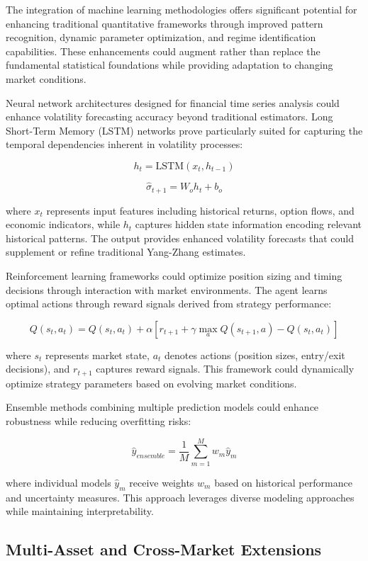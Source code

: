 \documentclass[
  american,
  11pt,
  11pt,
  letterpaper,
  onecolumn]{article}
\begin{document}
The integration of machine learning methodologies offers significant
potential for enhancing traditional quantitative frameworks through
improved pattern recognition, dynamic parameter optimization, and regime
identification capabilities. These enhancements could augment rather
than replace the fundamental statistical foundations while providing
adaptation to changing market conditions.

Neural network architectures designed for financial time series analysis
could enhance volatility forecasting accuracy beyond traditional
estimators. Long Short-Term Memory (LSTM) networks prove particularly
suited for capturing the temporal dependencies inherent in volatility
processes:

\[h_t = \text{LSTM}(x_t, h_{t-1})\]

\[\hat{\sigma}_{t+1} = W_o h_t + b_o\]

where \(x_t\) represents input features including historical returns,
option flows, and economic indicators, while \(h_t\) captures hidden
state information encoding relevant historical patterns. The output
provides enhanced volatility forecasts that could supplement or refine
traditional Yang-Zhang estimates.

Reinforcement learning frameworks could optimize position sizing and
timing decisions through interaction with market environments. The agent
learns optimal actions through reward signals derived from strategy
performance:

\[Q(s_t, a_t) = Q(s_t, a_t) + \alpha[r_{t+1} + \gamma \max_a Q(s_{t+1}, a) - Q(s_t, a_t)]\]

where \(s_t\) represents market state, \(a_t\) denotes actions (position
sizes, entry/exit decisions), and \(r_{t+1}\) captures reward signals.
This framework could dynamically optimize strategy parameters based on
evolving market conditions.

Ensemble methods combining multiple prediction models could enhance
robustness while reducing overfitting risks:

\[\hat{y}_{ensemble} = \frac{1}{M}\sum_{m=1}^{M} w_m \hat{y}_m\]

where individual models \(\hat{y}_m\) receive weights \(w_m\) based on
historical performance and uncertainty measures. This approach leverages
diverse modeling approaches while maintaining interpretability.

\subsection{Multi-Asset and Cross-Market
Extensions}\label{multi-asset-and-cross-market-extensions}
\end{document}
